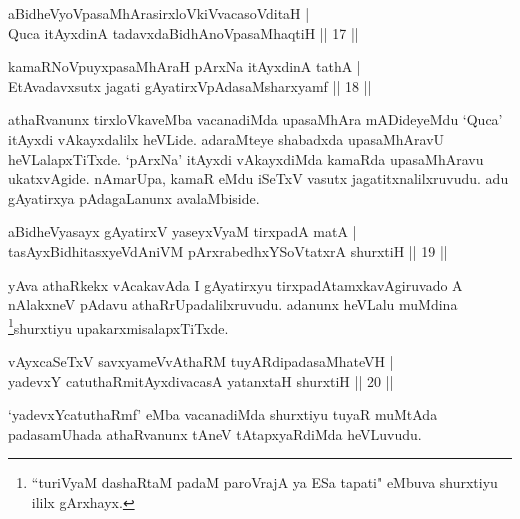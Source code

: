 
\begin{shl}
aBidheVyoVpasaMhArasirxloVkiVvacasoVditaH | \\
Quca itAyxdinA tadavxdaBidhAnoVpasaMhaqtiH \hfill ||  17 || 
\end{shl}

\begin{shl}
kamaRNoV\s puyxpasaMhAraH pArxNa itAyxdinA tathA | \\
EtAvadavxsutx jagati gAyatirxVpAdasaMsharxyamf \hfill ||  18 || 
\end{shl}

\begin{artha} 
athaRvanunx tirxloVkaveMba vacanadiMda upasaMhAra mADideyeMdu `Quca' 
itAyxdi vAkayxdalilx heVLide. adaraMteye shabadxda upasaMhAravU 
heVLalapxTiTxde. `pArxNa' itAyxdi vAkayxdiMda kamaRda upasaMhAravu 
ukatxvAgide. nAmarUpa, kamaR eMdu iSeTxV vasutx jagatitxnalilxruvudu. 
adu gAyatirxya pAdagaLanunx avalaMbiside.
\end{artha}


\begin{shl}
aBidheVyasayx gAyatirxV yaseyxVyaM tirxpadA matA | \\
tasAyxBidhitasxyeVdAniVM pArxrabedhxYSoVtatxrA shurxtiH \hfill ||  19 || 
\end{shl}

\begin{artha} 
yAva athaRkekx vAcakavAda I gAyatirxyu tirxpadAtamxkavAgiruvado A 
nAlakxneV pAdavu athaRrUpadalilxruvudu. adanunx heVLalu muMdina 
\footnote{``turiVyaM dashaRtaM padaM paroVrajA ya ESa tapati" 
eMbuva shurxtiyu ililx gArxhayx.}shurxtiyu upakarxmisalapxTiTxde.
\end{artha}


\begin{shl}
vAyxcaSeTxV savxyameVvAthaRM tuyARdipadasaMhateVH | \\
yadevxY catuthaRmitAyxdivacasA yatanxtaH shurxtiH \hfill ||  20 || 
\end{shl}

\begin{artha} 
`yadevxYcatuthaRmf' eMba vacanadiMda shurxtiyu tuyaR muMtAda 
padasamUhada athaRvanunx tAneV tAtapxyaRdiMda heVLuvudu.
\end{artha}

